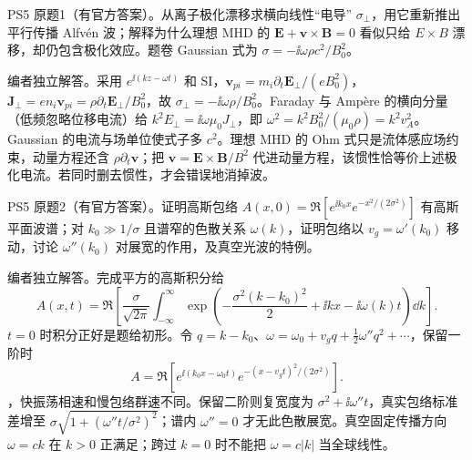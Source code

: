 \begin{exercise}\label{ex:hist02-5-1}
PS5 原题1（有官方答案）。从离子极化漂移求横向线性“电导” $\sigma_\perp$，用它重新推出平行传播 Alfv\'en 波；解释为什么理想 MHD 的 $\mathbf E+\mathbf v\times\mathbf B=0$ 看似只给 $E\times B$ 漂移，却仍包含极化效应。题卷 Gaussian 式为 $\sigma=-\ii\omega\rho c^2/B_0^2$。
\end{exercise}
\begin{solution}
编者独立解答。采用 $e^{\ii(kz-\omega t)}$ 和 SI，$\mathbf v_{pi}=m_i\partial_t\mathbf E_\perp/(eB_0^2)$，$\mathbf J_\perp=en_i\mathbf v_{pi}=\rho\partial_t\mathbf E_\perp/B_0^2$，故 $\sigma_\perp=-\ii\omega\rho/B_0^2$。Faraday 与 Amp\`ere 的横向分量（低频忽略位移电流）给 $k^2E_\perp=\ii\omega\mu_0J_\perp$，即 $\omega^2=k^2B_0^2/(\mu_0\rho)=k^2v_A^2$。Gaussian 的电流与场单位使式子多 $c^2$。理想 MHD 的 Ohm 式只是流体感应场约束，动量方程还含 $\rho\partial_t\mathbf v$；把 $\mathbf v=\mathbf E\times\mathbf B/B^2$ 代进动量方程，该惯性恰等价上述极化电流。若同时删去惯性，才会错误地消掉波。
\end{solution}

\begin{exercise}\label{ex:hist02-5-2}
PS5 原题2（有官方答案）。证明高斯包络 $A(x,0)=\Re[e^{\ii k_0x}e^{-x^2/(2\sigma^2)}]$ 有高斯平面波谱；对 $k_0\gg1/\sigma$ 且谱窄的色散关系 $\omega(k)$，证明包络以 $v_g=\omega'(k_0)$ 移动，讨论 $\omega''(k_0)$ 对展宽的作用，及真空光波的特例。
\end{exercise}
\begin{solution}
编者独立解答。完成平方的高斯积分给
\begin{equation}A(x,t)=\Re\left[\frac\sigma{\sqrt{2\pi}}\int_{-\infty}^\infty\exp\left(-\frac{\sigma^2(k-k_0)^2}{2}+\ii kx-\ii\omega(k)t\right)\dd k\right].\end{equation}
$t=0$ 时积分正好是题给初形。令 $q=k-k_0$、$\omega=\omega_0+v_gq+\frac12\omega''q^2+\cdots$，保留一阶时 \begin{equation}A=\Re\!\left[e^{\ii(k_0x-\omega_0t)}e^{-(x-v_gt)^2/(2\sigma^2)}\right].\end{equation}，快振荡相速和慢包络群速不同。保留二阶则复宽度为 $\sigma^2+\ii\omega''t$，真实包络标准差增至 $\sigma\sqrt{1+(\omega''t/\sigma^2)^2}$；谱内 $\omega''=0$ 才无此色散展宽。真空固定传播方向 $\omega=ck$ 在 $k>0$ 正满足；跨过 $k=0$ 时不能把 $\omega=c|k|$ 当全球线性。
\end{solution}

